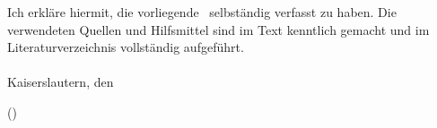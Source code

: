 \thispagestyle{empty}
\vspace*{15cm}

Ich erkl\"are hiermit, die vorliegende \RRLABVARtype\ selbst\"andig verfasst zu
haben. Die verwendeten Quellen und Hilfsmittel sind im Text kenntlich
gemacht und im Literaturverzeichnis vollst\"andig aufgef\"uhrt.\\
\ \\
Kaiserslautern, den \RRLABVARdeclarationdate

\vspace{3cm}

(\RRLABVARauthor )
